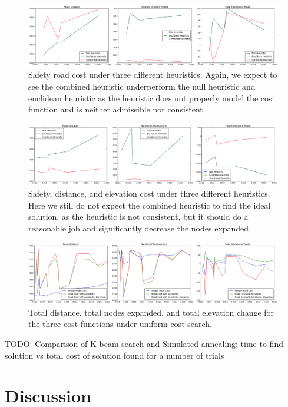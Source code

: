 \documentclass[11pt]{article}
\begin{document}
\begin{figure}[H]
\caption{Safety road cost under three different heuristics. Again, we expect to see the combined heuristic underperform the null heuristic and euclidean heuristic as the heuristic does not properly model the cost function and is neither admissible nor consistent }
\includegraphics[width=1\textwidth]{../images/cost_2.png}
\end{figure}

\begin{figure}[H]
\caption{Safety, distance, and elevation cost under three different heuristics. Here we still do not expect the combined heuristic to find the ideal solution, as the heuristic is not consistent, but it should do a reasonable job and significantly decrease the nodes expanded.}
\includegraphics[width=1\textwidth]{../images/cost_3.png}
\end{figure}

\begin{figure}[H]
\caption{Total distance, total nodes expanded, and total elevation change for the three cost functions under uniform cost search.}
\includegraphics[width=1\textwidth]{../images/total_costs.png}
\end{figure}

TODO: Comparison of K-beam search and Simulated annealing: time to find solution vs total cost of solution found for a number of trials

\section{Discussion}
\end{document}
